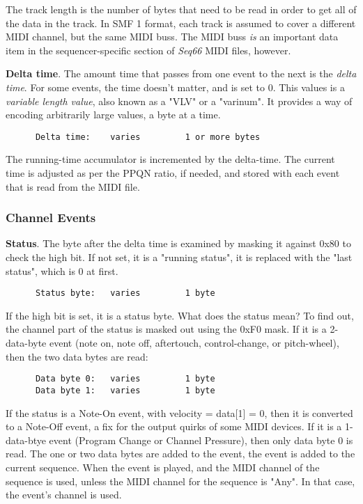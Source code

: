    The track length is the number of bytes that need to be read in order to get
   all of the data in the track.
   In SMF 1 format, each track is assumed to cover a different MIDI channel,
   but the same MIDI buss.
   The MIDI buss \textsl{is} an important data item in the sequencer-specific
   section of \textsl{Seq66} MIDI files, however.

   \textbf{Delta time}.
   The amount time that passes from one event to the next is the
   \textsl{delta time}.
   For some events, the time doesn't matter, and is set to 0.
   This values is a
   \textsl{variable length value}, also known as a "VLV" or a "varinum".   It
   provides a way of encoding arbitrarily large values, a byte at a time.

   \begin{verbatim}
      Delta time:    varies         1 or more bytes
   \end{verbatim}

   The running-time accumulator is incremented by the delta-time.
   The current time is adjusted as per the PPQN ratio, if needed, and stored with
   each event that is read from the MIDI file.

\subsubsection{Channel Events}
\label{subsubsec:midi_format_channel_events}

   \textbf{Status}.
   The byte after the delta time is examined by masking it against 0x80 to check
   the high bit.  If not set, it is a "running status", it is replaced with the
   "last status", which is 0 at first.

   \begin{verbatim}
      Status byte:   varies         1 byte
   \end{verbatim}

   If the high bit is set, it is a status byte.  What does the status mean?  To
   find out, the channel part of the status is masked out using the 0xF0 mask.
   If it is a 2-data-byte event (note on, note off, aftertouch, control-change,
   or pitch-wheel), then the two data bytes are read:

   \begin{verbatim}
      Data byte 0:   varies         1 byte
      Data byte 1:   varies         1 byte
   \end{verbatim}

   If the status is a Note-On event, with velocity = data[1] = 0,
   then it is converted to a Note-Off event, a fix for the output quirks of
   some MIDI devices.
   If it is a 1-data-btye event (Program Change or Channel Pressure), then only
   data byte 0 is read.
   The one or two data bytes are added to the event,
   the event is added to the current sequence.
   When the event is played,
   and the MIDI channel of the sequence is used, unless
   the MIDI channel for the sequence is "Any".
   In that case, the event's channel is used.

